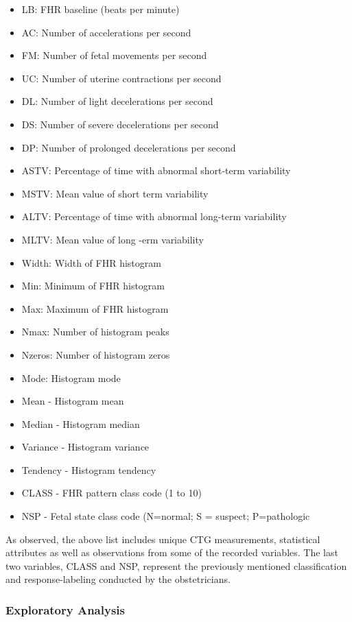 \documentclass[
]{article}
\providecommand{\tightlist}{%
  \setlength{\itemsep}{0pt}\setlength{\parskip}{0pt}}
\begin{document}
\begin{itemize}
\tightlist
\item
  LB: FHR baseline (beats per minute)\\
\item
  AC: Number of accelerations per second
\item
  FM: Number of fetal movements per second
\item
  UC: Number of uterine contractions per second
\item
  DL: Number of light decelerations per second
\item
  DS: Number of severe decelerations per second
\item
  DP: Number of prolonged decelerations per second
\item
  ASTV: Percentage of time with abnormal short-term variability
\item
  MSTV: Mean value of short term variability
\item
  ALTV: Percentage of time with abnormal long-term variability
\item
  MLTV: Mean value of long -erm variability
\item
  Width: Width of FHR histogram
\item
  Min: Minimum of FHR histogram
\item
  Max: Maximum of FHR histogram
\item
  Nmax: Number of histogram peaks
\item
  Nzeros: Number of histogram zeros
\item
  Mode: Histogram mode
\item
  Mean - Histogram mean
\item
  Median - Histogram median
\item
  Variance - Histogram variance
\item
  Tendency - Histogram tendency
\item
  CLASS - FHR pattern class code (1 to 10)
\item
  NSP - Fetal state class code (N=normal; S = suspect; P=pathologic
\end{itemize}

As observed, the above list includes unique CTG measurements,
statistical attributes as well as observations from some of the recorded
variables. The last two variables, CLASS and NSP, represent the
previously mentioned classification and response-labeling conducted by
the obstetricians.

\hypertarget{exploratory-analysis}{%
\subsubsection{Exploratory Analysis}\label{exploratory-analysis}}
\end{document}
